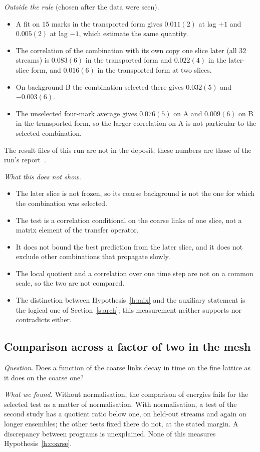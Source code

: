 \emph{Outside the rule} (chosen after the data were seen).
\begin{itemize}
\item A fit on $15$ marks in the transported form gives $0.011(2)$ at lag $+1$ and $0.005(2)$ at lag $-1$,
which estimate the same quantity.
\item The correlation of the combination with its own copy one slice later (all $32$ streams) is $0.083(6)$
in the transported form and $0.022(4)$ in the later-slice form, and $0.016(6)$ in the transported form at two
slices.
\item On background B the combination selected there gives $0.032(5)$ and $-0.003(6)$.
\item The unselected four-mark average gives $0.076(5)$ on A and $0.009(6)$ on B in the transported form, so
the larger correlation on A is not particular to the selected combination.
\end{itemize}
The result files of this run are not in the deposit; these numbers are those of the run's
report~\cite{RepoData}.

\emph{What this does not show.}
\begin{itemize}
\item The later slice is not frozen, so its coarse background is not the one for which the combination was
selected.
\item The test is a correlation conditional on the coarse links of one slice, not a matrix element of the
transfer operator.
\item It does not bound the best prediction from the later slice, and it does not exclude other combinations
that propagate slowly.
\item The local quotient and a correlation over one time step are not on a common scale, so the two are not
compared.
\item The distinction between Hypothesis~\ref{h:mix} and the auxiliary statement is the logical one of
Section~\ref{s:arch}; this measurement neither supports nor contradicts either.
\end{itemize}

\subsection{Comparison across a factor of two in the mesh}\label{s:cross}
\emph{Question.} Does a function of the coarse links decay in time on the fine lattice as it does on the
coarse one?

\emph{What we found.} Without normalisation, the comparison of energies fails for the selected test as a
matter of normalisation. With normalisation, a test of the second study has a quotient ratio below
one, on held-out streams and again on longer ensembles; the other tests fixed there do not, at the stated
margin. A discrepancy between programs is unexplained. None of this measures
Hypothesis~\ref{h:coarse}.

